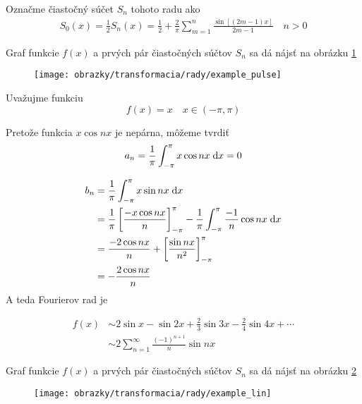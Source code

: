 \begin{priklad}
    Označme čiastočný súčet $S_n$ tohoto radu ako 
    \begin{align}
        S_0(x) = \frac{1}{2}
        S_n(x) = \frac{1}{2} + \frac{2}{\pi} \sum_{m=1}^{n}
                \frac{\sin\left[ (2m-1) x\right]}{2m-1} \quad n>0
    \end{align}
    
    Graf funkcie $f(x)$ a prvých pár čiastočných súčtov $S_n$ sa dá
    nájsť na obrázku \ref{fig:example_pulse}

    \begin{figure}[htp]
        \centering
        \texttt{[image: obrazky/transformacia/rady/example\_pulse]}
        \caption{}
        \label{fig:example_pulse}
    \end{figure}    
\end{priklad}

\begin{priklad}
   Uvažujme funkciu 
   \begin{equation}
        f(x) = x \quad x \in(-\pi,\pi)
   \end{equation}

    Pretože funkcia $x \cos nx$ je nepárna, môžeme tvrdiť
   \begin{equation}
        a_n = \frac{1}{\pi} \int_{-\pi}^{\pi} x \cos nx \; \mathrm{d} x =0
   \end{equation}

   \begin{equation}
   \begin{split}
        b_n &= \frac{1}{\pi} \int_{-\pi}^{\pi} x \sin nx \; \mathrm{d} x \\
        &= \frac{1}{\pi} \left[
            \frac{- x \cos nx}{n}
            \right]_{-\pi}^\pi -
            \frac{1}{\pi} \int_{-\pi}^{\pi} \frac{-1}{n} \cos nx \; \mathrm{d} x  \\
        &=
        \frac{-2 \cos nx}{n} + 
            \left[
                \frac{\sin nx}{n^2}
            \right]_{-\pi}^{\pi} \\
        &= -\frac{2 \cos nx}{n}
   \end{split}
   \end{equation}
   A teda Fourierov rad je
   
    \begin{equation}
    \begin{split}
        f(x) &\sim 2 \sin x - \sin 2x + \frac{2}{3} \sin 3x - \frac{2}{4}
        \sin 4x + \cdots \\
        &\sim 2\sum_{n=1}^{\infty} \frac{(-1)^{n+1}}{n} \sin nx
    \end{split}
    \end{equation}
    
    Graf funkcie $f(x)$ a prvých pár čiastočných súčtov $S_n$ sa dá
    nájsť na obrázku \ref{fig:example_lin}

    \begin{figure}[htp]
        \centering
        \texttt{[image: obrazky/transformacia/rady/example\_lin]}
        \caption{}
        \label{fig:example_lin}
    \end{figure}
\end{priklad}

